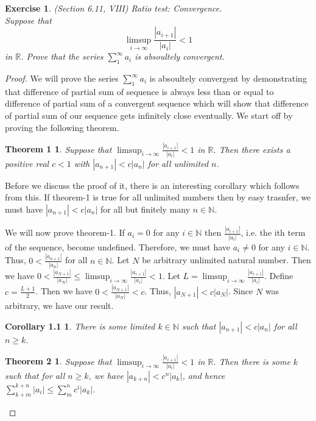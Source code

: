 \documentclass[a4paper, 11pt]{book}
\theoremstyle{plain}
\newtheorem{exercise}{Exercise}[chapter]
\newtheorem*{theorem1}{Theorem 1}
\newtheorem*{corollary1.1}{Corollary 1.1}
\newtheorem*{theorem2}{Theorem 2}
\theoremstyle{plain}
\newcommand{\arr}{\rightarrow}
\newcommand{\N}{\mathbb{N}}
\newcommand{\R}{\mathbb{R}}
\begin{document}
  \begin{exercise}
    (Section 6.11, VIII) Ratio test: Convergence. \\
    Suppose that $$\limsup_{i \arr \infty} \frac{|a_{i+1}|}{|a_i|}<1$$ in $\R$. Prove that the series $\sum_{1}^\infty a_i$ is absoultely convergent.
  \end{exercise}
  \begin{proof}
    We will prove the series $\sum_{1}^\infty a_i$ is absoultely convergent by demonstrating that difference of partial sum of sequence is always less than or equal to difference of partial sum of a convergent sequence which will show that difference of partial sum of our sequence gets infinitely close eventually. We start off by proving the following theorem. 
    \begin{theorem1}
      Suppose that $\limsup_{i \arr \infty} \frac{|a_{i+1}|}{|a_i|}<1$ in $\R$. Then there exists a positive real $c<1$ with $|a_{n+1}|<c|a_n|$ for all unlimited $n$.
    \end{theorem1}
      Before we discuss the proof of it, there is an interesting corollary which follows from this. If theorem-1 is true for all unlimited numbers then by easy trasnfer, we must have $|a_{n+1}|<c|a_n|$ for all but finitely many $n \in \N$. 

      We will now prove theorem-1. If $a_i=0$ for any $i \in \N$ then $\frac{|a_{i+1}|}{|a_i|}$, i.e. the ith term of the sequence, become undefined. Therefore, we must have $a_i \not = 0$ for any $i \in \N$. Thus, $0<\frac{|a_{n+1}|}{|a_n|}$ for all $n \in \N$. Let $N$ be arbitrary unlimited natural number. Then we have $0<\frac{|a_{N+1}|}{|a_N|} \leq \limsup_{i \arr \infty} \frac{|a_{i+1}|}{|a_i|}<1$. Let $L=\limsup_{i \arr \infty} \frac{|a_{i+1}|}{|a_i|}$. Define $c=\frac{L+1}{2}$. Then we have $0<\frac{|a_{N+1}|}{|a_N|}<c$. Thus, $|a_{N+1}|<c |a_N|$. Since $N$ was arbitrary, we have our result.
      \begin{corollary1.1} 
        There is some limited $k \in \N$ such that $|a_{n+1}|<c|a_n|$ for all $n \geq k$.
      \end{corollary1.1}

      \begin{theorem2}
        Suppose that $\limsup_{i \arr \infty} \frac{|a_{i+1}|}{|a_i|}<1$ in $\R$. Then there is some $k$ such that for all $n \geq k$, we have $|a_{k+n}|<c^n |a_k|$, and hence $\sum_{k+m}^{k+n} |a_i| \leq \sum_{m}^n c^i |a_k|$.
      \end{theorem2}


\end{proof}
\end{document}
